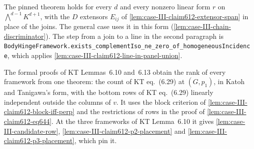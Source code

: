 \begin{fmlnote}
  The pinned theorem holds for every $d$ and every nonzero linear form
  $r$ on $\bigwedge^{d-1} K^{d+1}$, with the $D$ extensors $E_{ij}$ of
  \cref{lem:case-III-claim612-extensor-span} in place of the joins. The
  general case uses it in this form
  (\cref{lem:case-III-chain-discriminator}). The step from a join to a
  line in the second paragraph is
  \texttt{BodyHingeFramework.\allowbreak{}exists\_\allowbreak{}complementIso\_\allowbreak{}ne\_\allowbreak{}zero\_\allowbreak{}of\_\allowbreak{}homogeneousIncidence},
  which applies \cref{lem:case-III-claim612-line-in-panel-union}.
\end{fmlnote}

The formal proofs of KT Lemmas~6.10 and~6.13 obtain the rank of every
framework from one theorem: the count of KT eq.~(6.29) at $(G, p_1)$,
in Katoh and Tanigawa's form, with the bottom rows of KT eq.~(6.29)
linearly independent outside the columns of $v$. It uses the block
criterion of \cref{lem:case-III-claim612-block-iff-perp} and the
restrictions of rows in the proof of \cref{lem:case-III-claim612-eq644}.
At the three frameworks of KT Lemma~6.10 it gives
\cref{lem:case-III-candidate-row},
\cref{lem:case-III-claim612-p2-placement} and
\cref{lem:case-III-claim612-p3-placement}, which pin it.


